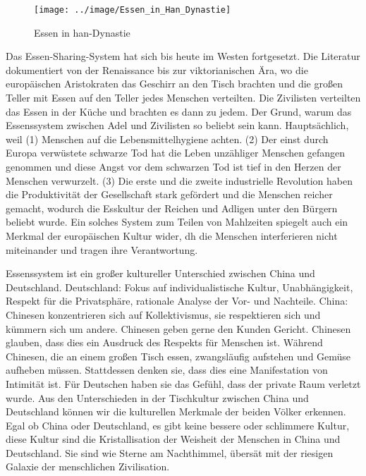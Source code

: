 \begin{figure}[htb]
	\centering
	\texttt{[image: ../image/Essen\_in\_Han\_Dynastie]}
	\caption{Essen in han-Dynastie}
	\label{fig:esseninhandynastie}
\end{figure}

\mypar
Das Essen-Sharing-System hat sich bis heute im Westen fortgesetzt. Die Literatur dokumentiert von der Renaissance bis zur viktorianischen Ära, wo die europäischen Aristokraten das Geschirr an den Tisch brachten und die gro\ss en Teller mit Essen auf den Teller jedes Menschen verteilten. Die Zivilisten verteilten das Essen in der Küche und brachten es dann zu jedem. Der Grund, warum das Essenssystem zwischen Adel und Zivilisten so beliebt sein kann. Hauptsächlich, weil (1)  Menschen auf die Lebensmittelhygiene achten. (2) Der einst durch Europa verwüstete schwarze Tod hat die Leben unzähliger Menschen gefangen genommen und diese Angst vor dem schwarzen Tod ist tief in den Herzen der Menschen verwurzelt. (3) Die erste und die zweite industrielle Revolution haben die Produktivität der Gesellschaft stark gefördert und die Menschen reicher gemacht, wodurch die Esskultur der Reichen und Adligen unter den Bürgern beliebt wurde. Ein solches System zum Teilen von Mahlzeiten spiegelt auch ein Merkmal der europäischen Kultur wider, dh die Menschen interferieren nicht miteinander und tragen ihre Verantwortung.

\mypar
Essenssystem ist ein gro\ss er kultureller Unterschied zwischen China und Deutschland. Deutschland: Fokus auf individualistische Kultur, Unabhängigkeit, Respekt für die Privatsphäre, rationale Analyse der Vor- und Nachteile. China: Chinesen konzentrieren sich auf Kollektivismus, sie respektieren sich und kümmern sich um andere. Chinesen geben gerne den Kunden Gericht. Chinesen glauben, dass dies ein Ausdruck des Respekts für Menschen ist. Während Chinesen, die an einem gro\ss en Tisch essen, zwangsläufig aufstehen und Gemüse aufheben müssen. Stattdessen denken sie, dass dies eine Manifestation von Intimität ist. Für Deutschen haben sie das Gefühl, dass der private Raum verletzt wurde.
Aus den Unterschieden in der Tischkultur zwischen China und Deutschland können wir die kulturellen Merkmale der beiden Völker erkennen. Egal ob China oder Deutschland, es gibt keine bessere oder schlimmere Kultur, diese Kultur sind die Kristallisation der Weisheit der Menschen in China und Deutschland. Sie sind wie Sterne am Nachthimmel, übersät mit der riesigen Galaxie der menschlichen Zivilisation.
